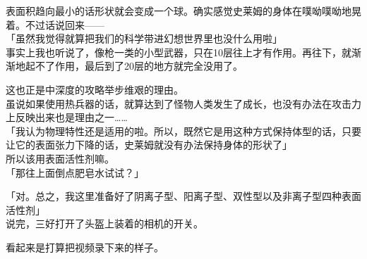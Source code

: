 表面积趋向最小的话形状就会变成一个球。确实感觉史莱姆的身体在噗呦噗呦地晃着。不过话说回来——\\

「虽然我觉得就算把我们的科学带进幻想世界里也没什么用啦」\\

事实上我也听说了，像枪一类的小型武器，只在10层往上才有作用。再往下，就渐渐地起不了作用，最后到了20层的地方就完全没用了。

这也正是中深度的攻略举步维艰的理由。\\

虽说如果使用热兵器的话，就算达到了怪物人类发生了成长，也没有办法在攻击力上反映出来也是理由之一……\\

「我认为物理特性还是适用的啦。所以，既然它是用这种方式保持体型的话，只要让它的表面张力下降的话，史莱姆就没有办法保持身体的形状了」\\

所以该用表面活性剂嘛。\\

「那往上面倒点肥皂水试试？」

「对。总之，我这里准备好了阴离子型、阳离子型、双性型以及非离子型四种表面活性剂」\\

说完，三好打开了头盔上装着的相机的开关。

看起来是打算把视频录下来的样子。\\

